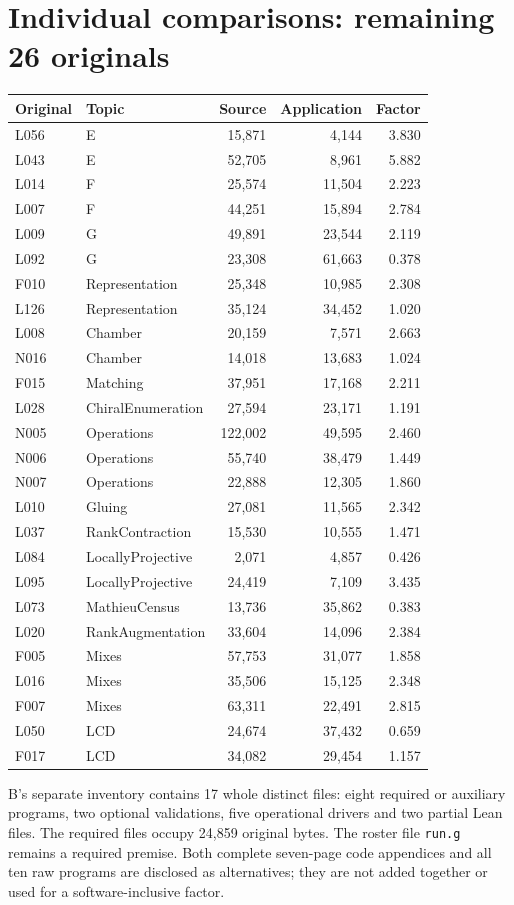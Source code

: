 \documentclass[11pt,a4paper]{article}
\begin{document}
\section*{Individual comparisons: remaining 26 originals}
\begin{center}\small\begin{tabular}{llrrr}\toprule
Original & Topic & Source & Application & Factor\\\midrule
L056 & E & 15,871 & 4,144 & 3.830 \\
L043 & E & 52,705 & 8,961 & 5.882 \\
L014 & F & 25,574 & 11,504 & 2.223 \\
L007 & F & 44,251 & 15,894 & 2.784 \\
L009 & G & 49,891 & 23,544 & 2.119 \\
L092 & G & 23,308 & 61,663 & 0.378 \\
F010 & Representation & 25,348 & 10,985 & 2.308 \\
L126 & Representation & 35,124 & 34,452 & 1.020 \\
L008 & Chamber & 20,159 & 7,571 & 2.663 \\
N016 & Chamber & 14,018 & 13,683 & 1.024 \\
F015 & Matching & 37,951 & 17,168 & 2.211 \\
L028 & ChiralEnumeration & 27,594 & 23,171 & 1.191 \\
N005 & Operations & 122,002 & 49,595 & 2.460 \\
N006 & Operations & 55,740 & 38,479 & 1.449 \\
N007 & Operations & 22,888 & 12,305 & 1.860 \\
L010 & Gluing & 27,081 & 11,565 & 2.342 \\
L037 & RankContraction & 15,530 & 10,555 & 1.471 \\
L084 & LocallyProjective & 2,071 & 4,857 & 0.426 \\
L095 & LocallyProjective & 24,419 & 7,109 & 3.435 \\
L073 & MathieuCensus & 13,736 & 35,862 & 0.383 \\
L020 & RankAugmentation & 33,604 & 14,096 & 2.384 \\
F005 & Mixes & 57,753 & 31,077 & 1.858 \\
L016 & Mixes & 35,506 & 15,125 & 2.348 \\
F007 & Mixes & 63,311 & 22,491 & 2.815 \\
L050 & LCD & 24,674 & 37,432 & 0.659 \\
F017 & LCD & 34,082 & 29,454 & 1.157 \\\bottomrule\end{tabular}\end{center}
B's separate inventory contains 17 whole distinct files: eight required or auxiliary programs, two optional validations, five operational drivers and two partial Lean files. The required files occupy 24,859 original bytes. The roster file \texttt{run.g} remains a required premise. Both complete seven-page code appendices and all ten raw programs are disclosed as alternatives; they are not added together or used for a software-inclusive factor.
\end{document}

